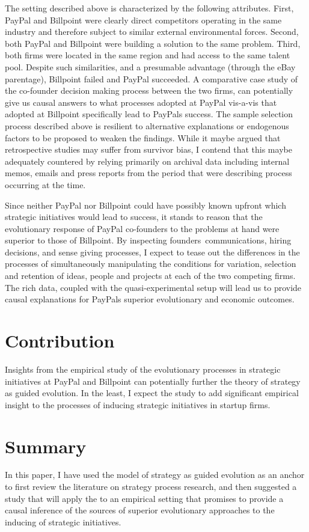 \documentclass[12pt,letterpaper]{article}
\begin{document}
The setting described above is characterized by the following attributes. First, PayPal and Billpoint were clearly direct competitors operating in the same industry and therefore subject to similar external environmental forces. Second, both PayPal and Billpoint were building a solution to the same problem. Third, both firms were located in the same region and had access to the same talent pool. Despite such similarities, and a presumable advantage (through the eBay parentage), Billpoint failed and PayPal succeeded. A comparative case study of the co-founder decision making process between the two firms, can potentially give us causal answers to what processes adopted at PayPal vis-a-vis that adopted at Billpoint specifically lead to PayPal\textquotesingle s success. The sample selection process described above is resilient to alternative explanations or endogenous factors to be proposed to weaken the findings. 
While it maybe argued that retrospective studies may suffer from survivor bias, I contend that this maybe adequately countered by relying primarily on archival data including internal memos, emails and press reports from the period that were describing process occurring at the time. 

Since neither PayPal nor Billpoint could have  possibly known upfront which strategic initiatives would lead to success, it stands to reason that the evolutionary response of PayPal co-founders to the problems at hand were superior to those of Billpoint. By inspecting founders\textquotesingle \ communications, hiring decisions, and sense giving processes, I expect to tease out the differences in the processes of simultaneously manipulating the conditions for variation, selection and retention of ideas, people and projects at each of the two competing firms. The rich data, coupled with the quasi-experimental setup will lead us to provide causal explanations for PayPal\textquotesingle s superior evolutionary and economic outcomes.

\section{Contribution}
Insights from the empirical study of the evolutionary processes in strategic initiatives at PayPal and Billpoint can potentially further the theory of strategy as guided evolution. In the least, I expect the study to add significant empirical insight to the processes of inducing strategic initiatives in startup firms.

\section{Summary}
In this paper, I have used the \cite{Lovas2000} model of strategy as guided evolution as an anchor to first review the literature on strategy process research, and then suggested a study that will apply the \cite{Lovas2000} to an empirical setting that promises to provide a causal inference of the sources of superior evolutionary approaches to the inducing of strategic initiatives. 
\end{document}
